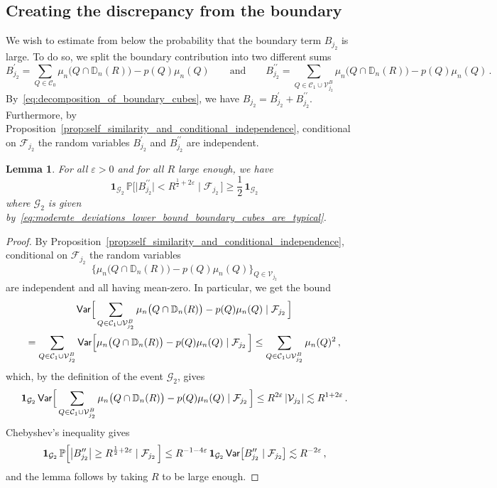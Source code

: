 \documentclass[11pt]{amsart}
\newtheorem{lemma}[theorem]{Lemma}
\theoremstyle{definition}
\theoremstyle{remark}
\numberwithin{equation}{section}
\def\eps{{\varepsilon}}
\newcommand{\bD}{\mathbb D}
\newcommand{\bP}{\mathbb P}
\newcommand{\Var}{{\sf Var}}
\begin{document}
	\subsection{Creating the discrepancy from the boundary}
	We wish to estimate from below the probability that the boundary term $B_{j_2}$ is large. To do so, we split the boundary contribution into two different sums
	\begin{equation*}
		B_{j_2}^\prime = \sum_{Q\in \mathcal{C}_0} \mu_n\big(Q\cap \bD_n(R)\big) - p(Q) \mu_n(Q) \qquad \text{and} \qquad B_{j_2}^{\prime\prime} = \sum_{Q\in \mathcal{C}_1\cup \mathcal{V}_{j_2}^B} \mu_n\big(Q\cap \bD_n(R)\big) - p(Q) \mu_n(Q) \, .
	\end{equation*}
	By~\eqref{eq:decomposition_of_boundary_cubes}, we have $B_{j_2} = B_{j_2}^\prime + B_{j_2}^{\prime\prime}$. Furthermore, by Proposition~\ref{prop:self_similarity_and_conditional_independence}, conditional on $\mathcal{F}_{j_2}$ the random variables $B_{j_2}^\prime$ and $B_{j_2}^{\prime\prime}$ are independent. 
	\begin{lemma}
		\label{lemma:moderate_deviations_lower_bound_bad_boundary_does_not_contribute}
		For all $\eps>0$ and for all $R$ large enough, we have
		\[
		\mathbf{1}_{\mathcal{G}_2} \, \bP\Big[ \big|B_{j_2}^{\prime\prime}\big| < R^{\frac{1}{2} + 2\eps} \mid \mathcal{F}_{j_2} \, \Big] \ge \frac{1}{2} \, \mathbf{1}_{\mathcal{G}_2}
		\]
		where $\mathcal{G}_2$ is given by~\eqref{eq:moderate_deviations_lower_bound_boundary_cubes_are_typical}.
	\end{lemma}
	\begin{proof}
		By Proposition~\ref{prop:self_similarity_and_conditional_independence}, conditional on $\mathcal{F}_{j_2}$ the random variables 
		\[
		\Big\{\mu_n\big(Q\cap \bD_n(R)\big) - p(Q) \mu_n(Q)\Big\}_{Q\in \mathcal{V}_{j_2}}
		\]
		are independent and all having mean-zero. In particular, we get the bound
		\begin{multline*}
			\Var\Big[\sum_{Q\in \mathcal{C}_1\cup \mathcal{V}_{j_2}^B} \mu_n\big(Q\cap \bD_n(R)\big) - p(Q) \mu_n(Q) \mid \mathcal{F}_{j_2} \, \Big] \\  = \sum_{Q\in \mathcal{C}_1\cup \mathcal{V}_{j_2}^B} \Var\Big[ \mu_n\big(Q\cap \bD_n(R)\big) - p(Q) \mu_n(Q) \mid \mathcal{F}_{j_2} \, \Big] \le \sum_{Q\in \mathcal{C}_1\cup \mathcal{V}_{j_2}^B} \mu_n(Q)^2\, ,
		\end{multline*}
		which, by the definition of the event $\mathcal{G}_2$, gives
		\[
		\mathbf{1}_{\mathcal{G}_2} \, \Var\Big[\sum_{Q\in \mathcal{C}_1\cup \mathcal{V}_{j_2}^B} \mu_n\big(Q\cap \bD_n(R)\big) - p(Q) \mu_n(Q) \mid \mathcal{F}_{j_2} \, \Big] \le R^{2\eps} \, |\mathcal{V}_{j_2}| \lesssim R^{1+2\eps}\, .
		\]
		Chebyshev's inequality gives
		\[
		\mathbf{1}_{\mathcal{G}_2} \, \bP\Big[ \big|B_{j_2}^{\prime\prime}\big| \ge R^{\frac{1}{2} + 2\eps} \mid \mathcal{F}_{j_2} \, \Big] \leq R^{-1-4\eps} \, \mathbf{1}_{\mathcal{G}_2} \, \Var\big[B_{j_2}^{\prime\prime}\mid \mathcal{F}_{j_2}\big] \lesssim R^{-2\eps}\, ,
		\]
		and the lemma follows by taking $R$ to be large enough.
	\end{proof}
\end{document}

